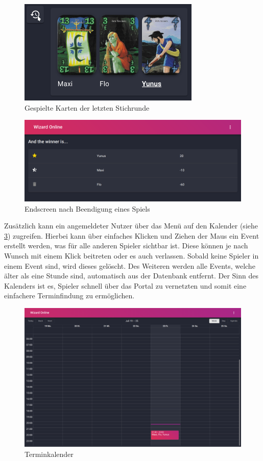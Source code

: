 \begin{figure}[h]
	\centering
	\includegraphics[height=5cm]{images/last-round.png}
	\caption{Gespielte Karten der letzten Stichrunde}
	\label{fig:last-round}
\end{figure}

\begin{figure}[h]
	\includegraphics[width=\textwidth]{images/end.png}
	\caption{Endscreen nach Beendigung eines Spiels}
	\label{fig:end}
\end{figure}

\clearpage
Zusätzlich kann ein angemeldeter Nutzer über das Menü auf den Kalender (siehe \cref{fig:calendar}) zugreifen. Hierbei kann über einfaches Klicken und Ziehen der Maus ein Event erstellt werden, was für alle anderen Spieler sichtbar ist. Diese können je nach Wunsch mit einem Klick beitreten oder es auch verlassen. Sobald keine Spieler in einem Event sind, wird dieses gelöscht. Des Weiteren werden alle Events, welche älter als eine Stunde sind, automatisch aus der Datenbank entfernt. Der Sinn des Kalenders ist es, Spieler schnell über das Portal zu vernetzten und somit eine einfachere Terminfindung zu ermöglichen.

\begin{figure}[h]
	\includegraphics[width=\textwidth]{images/calendar.png}
	\caption{Terminkalender}
	\label{fig:calendar}
\end{figure}
